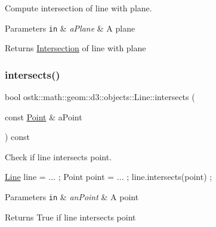 Compute intersection of line with plane. 


\begin{DoxyParams}[1]{Parameters}
\mbox{\tt in}  & {\em a\+Plane} & A plane \\
\hline
\end{DoxyParams}
\begin{DoxyReturn}{Returns}
\hyperlink{classostk_1_1math_1_1geom_1_1d3_1_1_intersection}{Intersection} of line with plane 
\end{DoxyReturn}
\mbox{\label{classostk_1_1math_1_1geom_1_1d3_1_1objects_1_1_line_a65d3865e67da2d1629fa1e302a2c62fe}} 
\subsubsection{\texorpdfstring{intersects()}{intersects()}\hspace{0.1cm}{\footnotesize\ttfamily [1/4]}}
{\footnotesize\ttfamily bool ostk\+::math\+::geom\+::d3\+::objects\+::\+Line\+::intersects (\begin{DoxyParamCaption}\item[{const \hyperlink{classostk_1_1math_1_1geom_1_1d3_1_1objects_1_1_point}{Point} \&}]{a\+Point }\end{DoxyParamCaption}) const}



Check if line intersects point. 


\begin{DoxyCode}
\hyperlink{classostk_1_1math_1_1geom_1_1d3_1_1objects_1_1_line_a9ebdaaf67a4bd91780808f8683463ebe}{Line} line = ... ;
Point point = ... ;
line.intersects(point) ;
\end{DoxyCode}



\begin{DoxyParams}[1]{Parameters}
\mbox{\tt in}  & {\em an\+Point} & A point \\
\hline
\end{DoxyParams}
\begin{DoxyReturn}{Returns}
True if line intersects point 
\end{DoxyReturn}
\mbox{\label{classostk_1_1math_1_1geom_1_1d3_1_1objects_1_1_line_a292e86df1d673e4f040691b25877a6ce}} 
